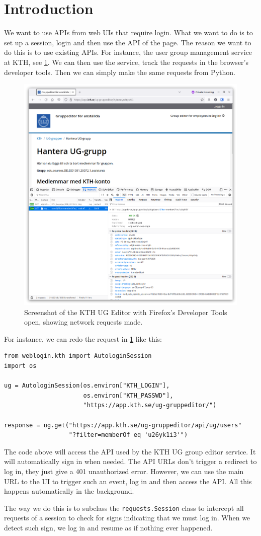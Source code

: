 \section{Introduction}

We want to use APIs from web UIs that require login.
What we want to do is to set up a session, login and then use the API of the 
page.
The reason we want to do this is to use existing APIs.
For instance, the user group management service at KTH, see \cref{UGEditor}.
We can then use the service, track the requests in the browser's developer 
tools.
Then we can simply make the same requests from Python.

\begin{figure}
  \includegraphics[width=\columnwidth]{figs/ug.png}
  \caption{Screenshot of the KTH UG Editor with Firefox's Developer Tools open, 
  showing network requests made.}
  \label{UGEditor}
\end{figure}

For instance, we can redo the request in \cref{UGEditor} like this:
\begin{verbatim}
from weblogin.kth import AutologinSession
import os

ug = AutologinSession(os.environ["KTH_LOGIN"],
                      os.environ["KTH_PASSWD"],
                      "https://app.kth.se/ug-gruppeditor/")

response = ug.get("https://app.kth.se/ug-gruppeditor/api/ug/users"
                  "?filter=memberOf eq 'u26yk1i3'")
\end{verbatim}
The code above will access the API used by the KTH UG group editor service.
It will automatically sign in when needed.
The API URLs don't trigger a redirect to log in, they just give a 401 
unauthorized error.
However, we can use the main URL to the UI to trigger such an event, log in and 
then access the API.
All this happens automatically in the background.

The way we do this is to subclass the \texttt{requests.Session} class to 
intercept all requests of a session to check for signs indicating that we must 
log in.
When we detect such sign, we log in and resume as if nothing ever happened.
